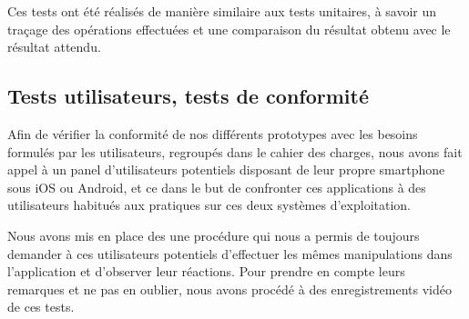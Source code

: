 \documentclass[a4paper, 11px]{article}
\begin{document}
Ces tests ont été réalisés de manière similaire aux tests unitaires, à savoir un traçage des opérations effectuées et une comparaison du résultat obtenu avec le résultat attendu.

\subsection{Tests utilisateurs, tests de conformité}
Afin de vérifier la conformité de nos différents prototypes avec les besoins formulés par les utilisateurs, regroupés dans le cahier des charges, nous avons fait appel à un panel d'utilisateurs potentiels disposant de leur propre smartphone sous iOS ou Android, et ce dans le but de confronter ces applications à des utilisateurs habitués aux pratiques sur ces deux systèmes d'exploitation.

Nous avons mis en place des une procédure qui nous a permis de toujours demander à ces utilisateurs potentiels d'effectuer les mêmes manipulations dans l'application et d'observer leur réactions. Pour prendre en compte leurs remarques et ne pas en oublier, nous avons procédé à des enregistrements vidéo de ces tests.
\end{document}
